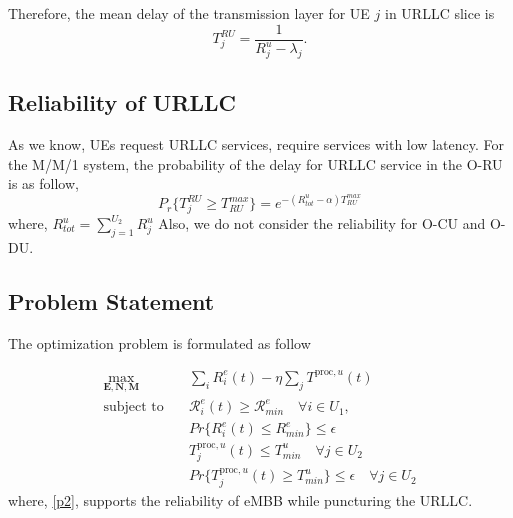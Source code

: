 \documentclass[conference]{IEEEtran}
\begin{document}
Therefore, the mean delay of the transmission layer for UE $j$ in URLLC slice is
\begin{equation}
 T_{j}^{RU} = \frac{1}{R_{j}^u - \lambda_{j}}.
\end{equation}


\subsection{Reliability of URLLC}
As we know, UEs request URLLC services, require services with low latency.
For the M/M/1 system, the probability of the delay for URLLC service in the O-RU is as follow, 
\begin{equation}
P_r\{T_{j}^{RU} \geq T_{RU}^{max}\} = e^{-(R_{tot}^u - \alpha)T_{RU}^{max}}
\end{equation} 
where, $R_{tot}^u = \sum_{j =1}^{U_2}R_{j}^u$
Also, we do not consider the reliability for O-CU and O-DU.

\subsection{Problem Statement}
The optimization problem is formulated as follow

\begin{subequations} \label{mainP}
\begin{alignat}{4}
\max\limits_{ \boldsymbol{E}, \boldsymbol{N},\boldsymbol{M} } &  \sum_i R_{i}^e(t) - \eta \sum_j T^{\text{proc}, u}(t)       \ \\
\text{subject to} \quad  & \mathcal{R}_{i}^e(t) \geq  \mathcal{R}_{min}^e \quad \forall i \in U_1, \label{p1} \\
& Pr\{{R}_{i}^e(t) \leq {R}_{min}^e\}  \leq \epsilon \label{p2}\\
&T^{\text{proc}, u}_j(t)  \leq T_{min}^u  \quad \forall j \in U_2 \label{p3} \\
&Pr\{T^{\text{proc}, u}_j(t) \geq T_{min}^u\} \leq \epsilon  \quad \forall j \in U_2 \label{p4} 
\end{alignat}
\label{constraints}
\end{subequations}
where, \eqref{p2}, supports the reliability of eMBB while puncturing the URLLC. 



\end{document}
